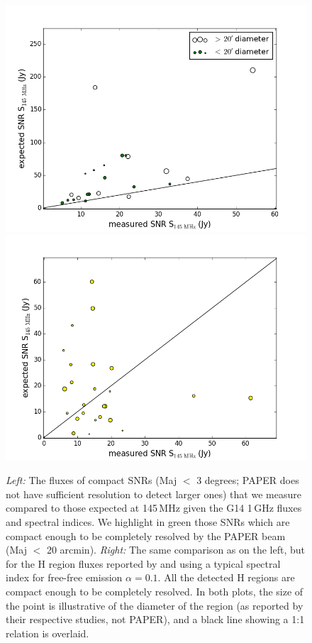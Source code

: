 \documentclass[useAMS,usenatbib]{mn2e}
\begin{document}
\begin{figure}
\centering
\includegraphics[scale=.4]{figs/GreenScatter.png}
\includegraphics[scale=.4]{figs/PaladiniScatter.png}
\caption{\textit{Left:} The fluxes of compact SNRs (Maj $<$ 3 degrees; PAPER does not have sufficient resolution to detect larger ones) that we measure compared to those expected at 145\,MHz given the G14 1\,GHz fluxes and spectral indices. We highlight in green those SNRs which are compact enough to be completely resolved by the PAPER beam (Maj $<$ 20 arcmin). \textit{Right:} The same comparison as on the left, but for the H{} region fluxes reported by \protect\cite{Paladini.03} and using a typical spectral index for free-free emission $\alpha=0.1$. All the detected H{} regions are compact enough to be completely resolved. In both plots, the size of the point is illustrative of the diameter of the region (as reported by their respective studies, not PAPER), and a black line showing a 1:1 relation is overlaid.}
\label{fig:comparisonscatters}
\end{figure}
\end{document}
